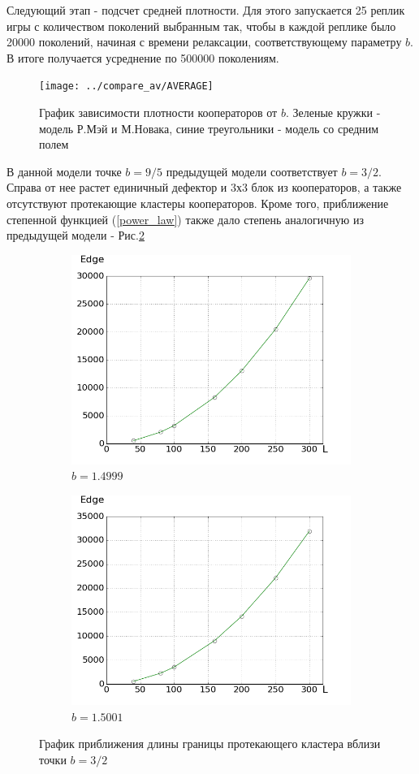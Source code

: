 \documentclass[a4paper]{article}
\begin{document}
	\par Следующий этап - подсчет средней плотности. Для этого запускается 25 реплик игры с количеством поколений выбранным так, чтобы в каждой реплике было 20000 поколений, начиная с времени релаксации, соответствующему параметру $b$. В итоге получается усреднение по 500000 поколениям. 
	
	\begin{figure}[H]
			\centering
			\texttt{[image: ../compare\_av/AVERAGE]}
			\caption{График зависимости плотности кооператоров от $b$. Зеленые кружки - модель Р.Мэй и М.Новака, синие треугольники - модель со средним полем}
			\label{average}
	\end{figure}
	
	\par В данной модели точке $b=9/5$ предыдущей модели соответствует $b=3/2$. Справа от нее растет единичный дефектор и 3х3 блок из кооператоров, а также отсутствуют протекающие кластеры кооператоров. Кроме того, приближение степенной функцией (\ref{power_law}) также дало степень аналогичную из предыдущей модели - Рис.\ref{new_edge} 
	
	\begin{figure}
		\begin{subfigure}{.6\textwidth}
			\includegraphics[width=.8\linewidth]{new_edge_left.png}
			\caption{$b=1.4999$}
		\end{subfigure}
		\begin{subfigure}{.6\textwidth}
			\includegraphics[width=.8\linewidth]{new_edge_right.png}
			\caption{$b=1.5001$}
		\end{subfigure}
		\caption{График приближения длины границы протекающего кластера вблизи точки $b=3/2$}
		\label{new_edge}
	\end{figure}
	
\end{document}
